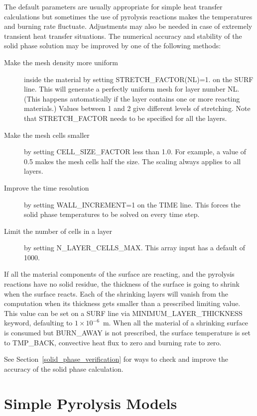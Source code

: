 \documentclass[11pt]{book}
\begin{document}
The default parameters are usually appropriate for simple heat transfer calculations but sometimes the use of pyrolysis reactions
makes the temperatures and burning rate fluctuate. Adjustments may also be needed in case of
extremely transient heat transfer situations. The numerical accuracy and stability of the solid phase solution may be improved by
one of the following methods:
\begin{description}
\item[Make the mesh density more uniform ] inside the material by setting {\ct STRETCH\_FACTOR(NL)=1.} on the {\ct SURF} line. This will generate a perfectly uniform mesh for layer number {\ct NL}. (This happens automatically if the layer contains one or more reacting materials.) Values between 1 and 2 give different levels of stretching. Note that {\ct STRETCH\_FACTOR} needs to be specified for all the layers.
\item[Make the mesh cells smaller] by setting {\ct CELL\_SIZE\_FACTOR} less than 1.0. For example, a value of 0.5 makes the mesh cells half the size. The scaling always applies to all layers.
\item[Improve the time resolution] by setting {\ct WALL\_INCREMENT=1} on the {\ct TIME} line. This forces the solid phase temperatures to be solved on every time step.
\item[Limit the number of cells in a layer] by setting {\ct N\_LAYER\_CELLS\_MAX}. This array input has a default of 1000.
\end{description}
If all the material components of the surface are reacting, and the pyrolysis reactions have no solid residue, the thickness of
the surface is going to shrink when the surface reacts. Each of the shrinking layers will vanish from the computation when its thickness gets
smaller than a prescribed limiting value. This value can be set on a {\ct SURF} line via {\ct MINIMUM\_LAYER\_THICKNESS} keyword,
defaulting to $1 \times 10^{-6}$~m. When all the material of a shrinking surface is consumed but {\ct BURN\_AWAY} is not
prescribed, the surface temperature is set to {\ct TMP\_BACK}, convective heat flux to zero and burning rate to zero.

See Section~\ref{solid_phase_verification} for ways to check and improve the accuracy of the solid phase calculation.




\section{Simple Pyrolysis Models}
\end{document}
